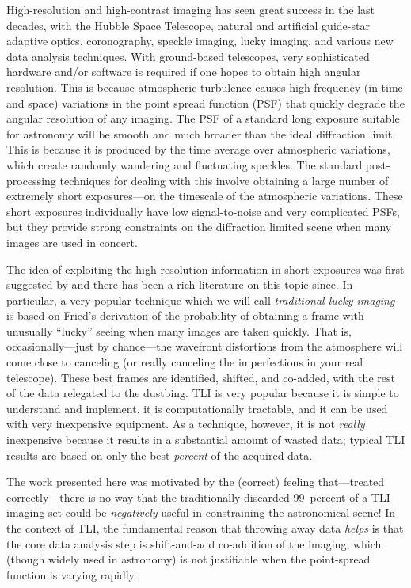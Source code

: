 \documentclass[12pt,preprint]{aastex}
\newcommand{\project}[1]{{\sffamily #1}}
\begin{document}
High-resolution and high-contrast imaging has seen great success in
the last decades, with the \project{Hubble Space Telescope}, natural
and artificial guide-star adaptive optics, coronography, speckle
imaging, lucky imaging, and various new data analysis techniques.
With ground-based telescopes, very sophisticated hardware and/or
software is required if one hopes to obtain high angular resolution.
This is because atmospheric turbulence causes high frequency (in time
and space) variations in the point spread function (PSF) that quickly
degrade the angular resolution of any imaging. The PSF of a standard
long exposure suitable for astronomy will be smooth and much broader
than the ideal diffraction limit. This is because it is produced by
the time average over atmospheric variations, which create randomly
wandering and fluctuating speckles. The standard post-processing
techniques for dealing with this involve obtaining a large number of
extremely short exposures---on the timescale of the atmospheric
variations. These short exposures individually have low
signal-to-noise and very complicated PSFs, but they provide strong
constraints on the diffraction limited scene when many images are used
in concert.

The idea of exploiting the high resolution information in short
exposures was first suggested by \citet{labeyrie} and there has been a
rich literature on this topic since. In particular, a very popular
technique which we will call \emph{traditional lucky imaging}
\citep[TLI;][]{law} is based on Fried's derivation of the probability
of obtaining a frame with unusually ``lucky'' seeing when many images
are taken quickly. That is, occasionally---just by chance---the
wavefront distortions from the atmosphere will come close to canceling
(or really canceling the imperfections in your real telescope).  These
best frames are identified, shifted, and co-added, with the rest of
the data relegated to the dustbing.  TLI is very popular because it is
simple to understand and implement, it is computationally tractable,
and it can be used with very inexpensive equipment.  As a technique,
however, it is not \emph{really} inexpensive because it results in a
substantial amount of wasted data; typical TLI results are based on
only the best \emph{percent} of the acquired data.

The work presented here was motivated by the (correct) feeling
that---treated correctly---there is no way that the traditionally
discarded 99~percent of a TLI imaging set could be \emph{negatively}
useful in constraining the astronomical scene!  In the context of TLI,
the fundamental reason that throwing away data \emph{helps} is that
the core data analysis step is shift-and-add co-addition of the
imaging, which (though widely used in astronomy) is not justifiable
when the point-spread function is varying rapidly.
\end{document}
